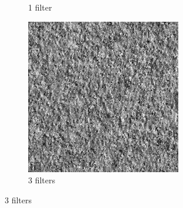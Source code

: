 \documentclass[11pt, oneside]{article}   	%
\begin{document}
\begin{figure}[H]
\begin{subfigure}[b]{0.3\textwidth}
        \caption{1 filter}
        \label{fig:fur1}
    \end{subfigure}
    \begin{subfigure}[b]{0.3\textwidth}
        \includegraphics[width=\textwidth]{fur3}
        \caption{3 filters}
        \label{fig:fur3}
    \end{subfigure}
    

\end{figure}
\end{document}
